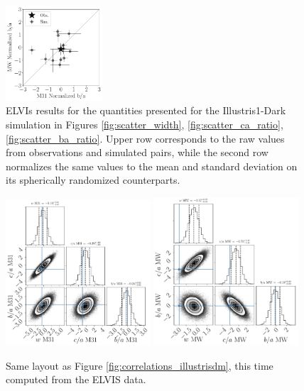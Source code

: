 \documentclass[a4paper,fleqn,usenatbib]{mnras}
\begin{document}
\begin{figure}
\includegraphics[width=0.32\textwidth]{scatter_norm_ranked_elvis_ba_ratio.pdf}
\caption{ELVIs results for the quantities presented for the Illustris1-Dark
  simulation in Figures  \ref{fig:scatter_width},
  \ref{fig:scatter_ca_ratio}, \ref{fig:scatter_ba_ratio}.
Upper row corresponds to the raw values from observations and
simulated pairs, while the second row normalizes the same values to
the mean and standard deviation on its spherically randomized
counterparts. 
\label{fig:scatter_elvis}}
\end{figure}

\begin{figure}
\centering
\includegraphics[width=0.48\textwidth]{gaussian_model_elvis_M31.pdf}
\includegraphics[width=0.48\textwidth]{gaussian_model_elvis_MW.pdf}
\caption{
Same layout as Figure \ref{fig:correlations_illustrisdm}, this time
computed from the ELVIS data.
\label{fig:correlations_elvis}}
\end{figure}
\end{document}
